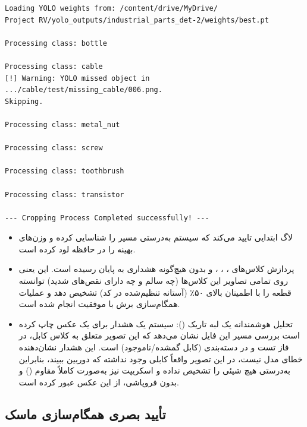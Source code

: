\documentclass{article}
\begin{document}
\begin{tcolorbox}[colback=Tan!15, colframe=MidnightBlue, title=خروجی لاگ اجرایی همگام سازی ماسک ها]
	\begin{latin}
		\begin{verbatim}
Loading YOLO weights from: /content/drive/MyDrive/
Project RV/yolo_outputs/industrial_parts_det-2/weights/best.pt		

Processing class: bottle

Processing class: cable
[!] Warning: YOLO missed object in .../cable/test/missing_cable/006.png. 
Skipping.

Processing class: metal_nut

Processing class: screw

Processing class: toothbrush

Processing class: transistor

--- Cropping Process Completed successfully! ---
		\end{verbatim}
	\end{latin}
\end{tcolorbox}


\begin{itemize}
	\item  لاگ ابتدایی تایید می‌کند که سیستم به‌درستی مسیر  را شناسایی کرده و وزن‌های بهینه را در حافظه لود کرده است.
	
	\item پردازش کلاس‌های ، ، ،  و  بدون هیچ‌گونه هشداری به پایان رسیده است. این یعنی  روی تمامی تصاویر این کلاس‌ها (چه سالم و چه دارای نقص‌های شدید) توانسته قطعه را با اطمینان بالای ۵۰٪ (آستانه تنظیم‌شده در کد) تشخیص دهد و عملیات همگام‌سازی برش با موفقیت انجام شده است.
	
	\item تحلیل هوشمندانه یک لبه تاریک (): سیستم یک هشدار برای یک عکس چاپ کرده است
	بررسی مسیر این فایل نشان می‌دهد که این تصویر متعلق به کلاس کابل، در فاز تست و در دسته‌بندی  (کابل گمشده/ناموجود) است. این هشدار نشان‌دهنده خطای مدل نیست، در این تصویر واقعاً کابلی وجود نداشته که دوربین ببیند، بنابراین  به‌درستی هیچ شیئی را تشخیص نداده و اسکریپت نیز به‌صورت کاملاً مقاوم () و بدون فروپاشی، از این عکس عبور کرده است.
\end{itemize}

\subsection{تأیید بصری همگام‌سازی ماسک}
\end{document}
